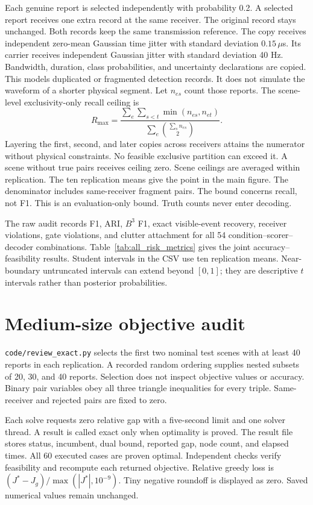 \documentclass[10pt,a4paper]{article}
\begin{document}
Each genuine report is selected independently with probability 0.2. A selected report receives one extra record at the same receiver. The original record stays unchanged. Both records keep the same transmission reference. The copy receives independent zero-mean Gaussian time jitter with standard deviation $0.15\,\mu$s. Its carrier receives independent Gaussian jitter with standard deviation 40 Hz. Bandwidth, duration, class probabilities, and uncertainty declarations are copied. This models duplicated or fragmented detection records. It does not simulate the waveform of a shorter physical segment. Let $n_{es}$ count those reports. The scene-level exclusivity-only recall ceiling is
\[
 R_{\max}=\frac{\sum_e\sum_{s<t}\min(n_{es},n_{et})}
 {\sum_e\binom{\sum_s n_{es}}2}.
\]
Layering the first, second, and later copies across receivers attains the numerator without physical constraints. No feasible exclusive partition can exceed it. A scene without true pairs receives ceiling zero. Scene ceilings are averaged within replication. The ten replication means give the point in the main figure. The denominator includes same-receiver fragment pairs. The bound concerns recall, not F1. This is an evaluation-only bound. Truth counts never enter decoding.

The raw audit records F1, ARI, $B^3$ F1, exact visible-event recovery, receiver violations, gate violations, and clutter attachment for all 54 condition--scorer--decoder combinations. Table~\ref{tab:all_risk_metrics} gives the joint accuracy--feasibility results. Student intervals in the CSV use ten replication means. Near-boundary untruncated intervals can extend beyond $[0,1]$; they are descriptive $t$ intervals rather than posterior probabilities.

\FloatBarrier

\section{Medium-size objective audit}
\texttt{code/review\_exact.py} selects the first two nominal test scenes with at least 40 reports in each replication. A recorded random ordering supplies nested subsets of 20, 30, and 40 reports. Selection does not inspect objective values or accuracy. Binary pair variables obey all three triangle inequalities for every triple. Same-receiver and rejected pairs are fixed to zero.

Each solve requests zero relative gap with a five-second limit and one solver thread. A result is called exact only when optimality is proved. The result file stores status, incumbent, dual bound, reported gap, node count, and elapsed times. All 60 executed cases are proven optimal. Independent checks verify feasibility and recompute each returned objective. Relative greedy loss is $(J^*-J_g)/\max(|J^*|,10^{-9})$. Tiny negative roundoff is displayed as zero. Saved numerical values remain unchanged.
\end{document}
